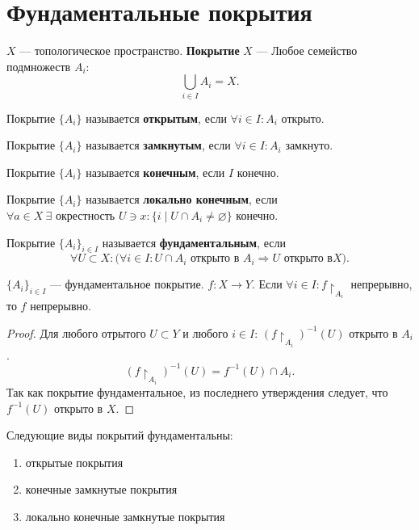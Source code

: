 \documentclass[11pt]{book}
\theoremstyle{definition}
\theoremstyle{plain}
\theoremstyle{plain}
\theoremstyle{definition}
\theoremstyle{remark}
\begin{document}
\section{Фундаментальные покрытия}
\begin{defn}
    $ X$ --- топологическое пространство. {\bf Покрытие}  $ X$ --- Любое семейство подмножеств  $ A_i$:
    \[
    \bigcup_{i \in  I} A_i = X
.\] 
\begin{description}
    \item Покрытие $ \{A_i\}$ называется {\bf открытым}, если $ \forall i \in I: A_i $ открыто. 
    \item Покрытие $ \{A_i\}$ называется {\bf замкнутым}, если $ \forall i \in I: A_i $ замкнуто. 
    \item Покрытие $ \{A_i\}$ называется {\bf конечным}, если $ I$ конечно. 
    \item Покрытие $ \{A_i\}$ называется {\bf локально конечным}, если $ \forall a \in X ~ \exists \text{ окрестность } U \ni x: \{i \mid U \cap A_i \ne \varnothing\}$ конечно. 
\end{description}
\end{defn}
\begin{defn}
    Покрытие  $ \{A_i\}_{i \in I}$ называется {\bf фундаментальным}, если \[
	\forall  U \subset X : \bigl( \forall i \in I: U \cap A_i \text{ открыто в } A_i \Longrightarrow U \text{ открыто в} X\bigr)
    .\]  
\end{defn}
\begin{thm}
    $ \{A_i\}_{i \in I}$ --- фундаментальное покрытие. $ f: X \to  Y$. Если $ \forall i \in I: f\!\upharpoonright_{A_i}$ непрерывно, то $ f$ непрерывно.
\end{thm}
\begin{proof}
    Для любого отрытого $ U \subset Y$ и любого $ i \in I$: $ \left( f\!\upharpoonright_{A_i} \right)^{-1}(U)$ открыто в $ A_i$.
     \[
	 \left( f\!\upharpoonright_{A_i} \right)^{-1}(U) = f^{-1}(U) \cap A_i
    .\] 
    Так как покрытие фундаментальное, из последнего утверждения следует, что $ f^{-1}(U)$ открыто в $ X$.
\end{proof}
\begin{thm}
    Следующие виды покрытий фундаментальны:
    \begin{enumerate}
        \item открытые покрытия
	\item конечные замкнутые покрытия
	\item локально конечные замкнутые покрытия
    \end{enumerate}
\end{thm}
\end{document}
